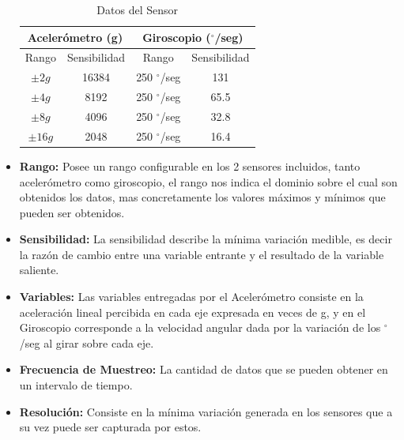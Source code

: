 \documentclass[12pt,a4paper]{article}
\newcommand{\grad}{$^{\circ}$}
\begin{document}
\begin{itemize}

\begin{table}[H]
  \centering
  \caption{Datos del Sensor}
  \begin{tabular}{|c|c|c|c|}
  \hline
  \multicolumn{2}{|c|}{Acelerómetro (g)} &\multicolumn{2}{|c|}{Giroscopio (\grad/seg)}   \\
  \hline
  Rango        & Sensibilidad   & Rango      & Sensibilidad \\ \hline
  $\pm 2g$     &  16384 & 250 \grad/seg  & 131      	\\ 
  $\pm 4g$     &  8192  & 250 \grad/seg  & 65.5      	\\
  $\pm 8g$     &  4096  & 250 \grad/seg  & 32.8      	\\
  $\pm 16g$    &  2048  & 250 \grad/seg  & 16.4      	\\ \hline
  \end{tabular}
\end{table}

\item \textbf{Rango: } Posee un rango configurable en los 2 sensores incluidos, tanto acelerómetro como giroscopio, el rango nos indica el dominio sobre el cual son obtenidos los datos, mas concretamente los valores máximos y mínimos que pueden ser obtenidos.
	
\item \textbf{Sensibilidad: }La sensibilidad describe la mínima variación medible, es decir la razón de cambio entre una variable entrante y el resultado de la variable saliente.

\item \textbf{Variables: } Las variables entregadas por el Acelerómetro consiste en la aceleración lineal percibida en cada eje expresada en veces de g, y en el Giroscopio corresponde  a la velocidad angular dada por la variación de los \grad/seg al girar sobre cada eje.

\item \textbf{Frecuencia de Muestreo: } La cantidad de datos que se pueden obtener en un intervalo de tiempo.

\item \textbf{Resolución: } Consiste en la mínima variación generada en los sensores que a su vez puede ser capturada por estos.

\end{itemize}
\end{document}

